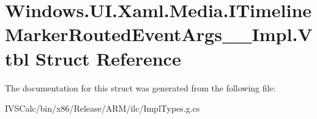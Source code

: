 \hypertarget{struct_windows_1_1_u_i_1_1_xaml_1_1_media_1_1_i_timeline_marker_routed_event_args_____impl_1_1_vtbl}{}\section{Windows.\+U\+I.\+Xaml.\+Media.\+I\+Timeline\+Marker\+Routed\+Event\+Args\+\_\+\+\_\+\+Impl.\+Vtbl Struct Reference}
\label{struct_windows_1_1_u_i_1_1_xaml_1_1_media_1_1_i_timeline_marker_routed_event_args_____impl_1_1_vtbl}


The documentation for this struct was generated from the following file\+:\begin{DoxyCompactItemize}
\item 
I\+V\+S\+Calc/bin/x86/\+Release/\+A\+R\+M/ilc/Impl\+Types.\+g.\+cs\end{DoxyCompactItemize}
